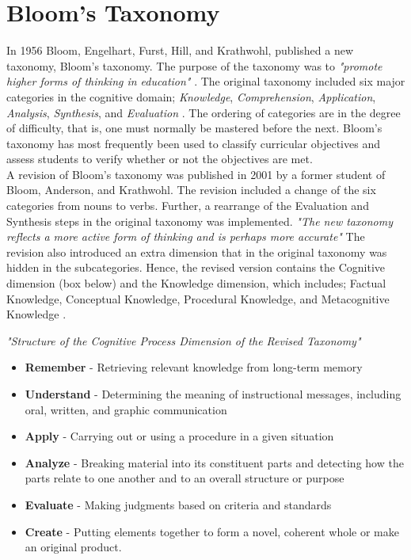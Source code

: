 \section{Bloom's Taxonomy}

In 1956 Bloom, Engelhart, Furst, Hill, and Krathwohl, published a new taxonomy, Bloom's taxonomy. The purpose of the taxonomy was to \textit{"promote higher forms of thinking in education"} \cite[p. 1]{clark2015blooms}. The original taxonomy included six major categories in the cognitive domain; \textit{Knowledge}, \textit{Comprehension}, \textit{Application}, \textit{Analysis}, \textit{Synthesis}, and \textit{Evaluation} \cite[p. 212]{krathwohl2002revisedbloom}. The ordering of categories are in the degree of difficulty, that is, one must normally be mastered before the next. Bloom's taxonomy has most frequently been used to classify curricular objectives and assess students to verify whether or not the objectives are met.\\

\noindent
A revision of Bloom's taxonomy was published in 2001 by a former student of Bloom, Anderson, and Krathwohl. The revision included a change of the six categories from nouns to verbs. Further, a rearrange of the Evaluation and Synthesis steps in the original taxonomy was implemented. \textit{"The new taxonomy reflects a more active form of thinking and is perhaps more accurate"} \cite[p. 4]{clark2015blooms} The revision also introduced an extra dimension that in the original taxonomy was hidden in the subcategories. Hence, the revised version contains the Cognitive dimension (box below) and the  Knowledge dimension, which includes; Factual Knowledge, Conceptual Knowledge, Procedural Knowledge, and Metacognitive Knowledge \cite[p. 214]{krathwohl2002revisedbloom}.

\begin{kasse}
\textit{"Structure of the Cognitive Process Dimension of the Revised Taxonomy"} \cite[p. 215]{krathwohl2002revisedbloom}

\begin{itemize}
\setlength\itemsep{0.05em}
  \item \textbf{Remember} - Retrieving relevant knowledge from long-term memory
  \item \textbf{Understand} - Determining the meaning of instructional messages, including oral, written, and graphic communication
  \item \textbf{Apply} - Carrying out or using a procedure in a given situation 
  \item \textbf{Analyze} - Breaking material into its constituent parts and detecting how the parts relate to one another and to an overall structure or purpose
  \item \textbf{Evaluate} - Making judgments based on criteria and standards
  \item \textbf{Create} - Putting elements together to form a novel, coherent whole or make an original product.
\end{itemize}
\end{kasse}


